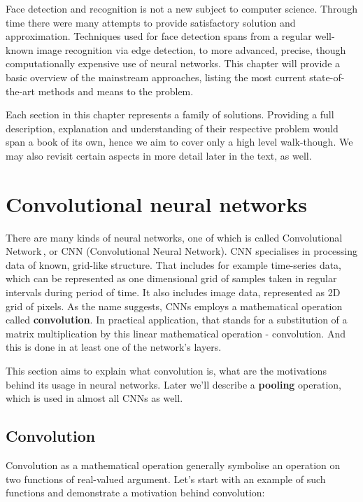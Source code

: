 Face detection and recognition is not a new subject to computer science. Through time there were many attempts to provide satisfactory solution and approximation. Techniques used for face detection spans from a regular well-known image recognition via edge detection, to more advanced, precise, though computationally expensive use of neural networks. This chapter will provide a basic overview of the mainstream approaches, listing the most current state-of-the-art methods and means to the problem.

Each section in this chapter represents a family of solutions. Providing a full description, explanation and understanding of their respective problem would span a book of its own, hence we aim to cover only a high level walk-though. We may also revisit certain aspects in more detail later in the text, as well.

\section{Convolutional neural networks}

There are many kinds of neural networks, one of which is called Convolutional Network\,\cite[p.~330]{deeplearningbook}, or CNN (Convolutional Neural Network). CNN specialises in processing data of known, grid-like structure. That includes for example time-series data, which can be represented as one dimensional grid of samples taken in regular intervals during period of time. It also includes image data, represented as 2D grid of pixels. As the name suggests, CNNs employs a mathematical operation called \textbf{convolution}. In practical application, that stands for a substitution of a matrix multiplication by this linear mathematical operation - convolution. And this is done in at least one of the network's layers.

This section aims to explain what convolution is, what are the motivations behind its usage in neural networks. Later we'll describe a \textbf{pooling} operation, which is used in almost all CNNs as well.

\subsection{Convolution}
\label{ss:conv}

Convolution as a mathematical operation generally symbolise an operation on two functions of real-valued argument. Let's start with an example of such functions and demonstrate a motivation behind convolution:

